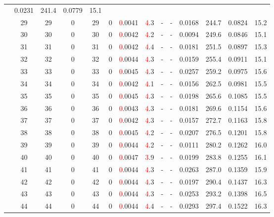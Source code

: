\begin{table}[htb]
{\begin{tabular}{|c|c|c|c|c|c|c|c|c|c|c|c|c|c|}
 & 0.0231 & 241.4
 & 0.0779 & 15.1
 \\
 & 
29 & 29 & 0 & 29 & 0
 & \textcolor{red}0.0041 & \textcolor{red}4.3
 & - & -
 & 0.0168 & 244.7
 & 0.0824 & 15.2
 \\
 & 
30 & 30 & 0 & 30 & 0
 & \textcolor{red}0.0042 & \textcolor{red}4.2
 & - & -
 & 0.0094 & 249.6
 & 0.0846 & 15.1
 \\
 & 
31 & 31 & 0 & 31 & 0
 & \textcolor{red}0.0042 & \textcolor{red}4.4
 & - & -
 & 0.0181 & 251.5
 & 0.0897 & 15.3
 \\
 & 
32 & 32 & 0 & 32 & 0
 & \textcolor{red}0.0044 & \textcolor{red}4.3
 & - & -
 & 0.0159 & 255.4
 & 0.0911 & 15.1
 \\
 & 
33 & 33 & 0 & 33 & 0
 & \textcolor{red}0.0045 & \textcolor{red}4.3
 & - & -
 & 0.0257 & 259.2
 & 0.0975 & 15.6
 \\
 & 
34 & 34 & 0 & 34 & 0
 & \textcolor{red}0.0042 & \textcolor{red}4.1
 & - & -
 & 0.0156 & 262.5
 & 0.0981 & 15.5
 \\
 & 
35 & 35 & 0 & 35 & 0
 & \textcolor{red}0.0045 & \textcolor{red}4.3
 & - & -
 & 0.0198 & 265.6
 & 0.1085 & 15.5
 \\
 & 
36 & 36 & 0 & 36 & 0
 & \textcolor{red}0.0043 & \textcolor{red}4.3
 & - & -
 & 0.0181 & 269.6
 & 0.1154 & 15.6
 \\
 & 
37 & 37 & 0 & 37 & 0
 & \textcolor{red}0.0042 & \textcolor{red}4.3
 & - & -
 & 0.0157 & 272.7
 & 0.1163 & 15.8
 \\
 & 
38 & 38 & 0 & 38 & 0
 & \textcolor{red}0.0045 & \textcolor{red}4.2
 & - & -
 & 0.0207 & 276.5
 & 0.1201 & 15.8
 \\
 & 
39 & 39 & 0 & 39 & 0
 & \textcolor{red}0.0044 & \textcolor{red}4.2
 & - & -
 & 0.0111 & 280.2
 & 0.1262 & 16.0
 \\
 & 
40 & 40 & 0 & 40 & 0
 & \textcolor{red}0.0047 & \textcolor{red}3.9
 & - & -
 & 0.0199 & 283.8
 & 0.1255 & 16.1
 \\
 & 
41 & 41 & 0 & 41 & 0
 & \textcolor{red}0.0044 & \textcolor{red}4.3
 & - & -
 & 0.0263 & 287.0
 & 0.1359 & 15.9
 \\
 & 
42 & 42 & 0 & 42 & 0
 & \textcolor{red}0.0044 & \textcolor{red}4.3
 & - & -
 & 0.0197 & 290.4
 & 0.1437 & 16.3
 \\
 & 
43 & 43 & 0 & 43 & 0
 & \textcolor{red}0.0044 & \textcolor{red}4.3
 & - & -
 & 0.0253 & 293.2
 & 0.1398 & 16.5
 \\
 & 
44 & 44 & 0 & 44 & 0
 & \textcolor{red}0.0044 & \textcolor{red}4.4
 & - & -
 & 0.0293 & 297.4
 & 0.1522 & 16.3
 \\

\end{tabular}}
\end{table}
